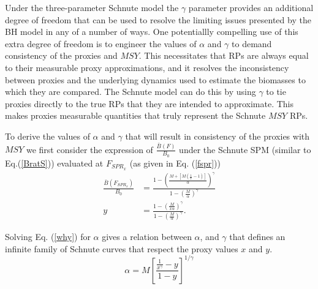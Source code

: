 %
Under the three-parameter Schnute model the $\gamma$ parameter provides an 
additional degree of freedom that can be used to resolve the limiting 
issues presented by the BH model in any of a number of ways. 
One potentiallly compelling use of this extra degree of freedom is to  
engineer the values of $\alpha$ and $\gamma$ to demand consistency of 
the proxies and $MSY$.
This necessitates that RPs are always equal to their measurable proxy approximations, 
and it resolves the inconsistency between proxies and the underlying dynamics 
used to estimate the biomasses to which they are compared. The Schnute model 
can do this by using $\gamma$ to tie proxies directly to the true RPs that 
they are intended to approximate. This makes proxies measurable quantities 
that truly represent the Schnute $MSY$ RPs. 

%
To derive the values of $\alpha$ and $\gamma$ that will result in consistency of
the proxies with $MSY$ we first consider the expression of $\frac{\bar B(F)}{B_0}$ 
under the Schnute SPM (similar to Eq.(\ref{BratS})) evaluated at $F_{SPR_x}$ (as given in Eq. (\ref{fspr})) %
%
\begin{align}
	\frac{\bar B(F_{SPR_x})}{B_0} &= \frac{1-\left(\frac{M+\left[M\left(\frac{1}{x}-1\right)\right]}{\alpha}\right)^\gamma}{ 1-\left(\frac{M}{\alpha}\right)^\gamma } \nonumber\\
	y&=\frac{1-\left(\frac{M}{x\alpha}\right)^\gamma}{ 1-\left(\frac{M}{\alpha}\right)^\gamma } \label{why}.
\end{align}

Solving Eq. (\ref{why}) for $\alpha$ gives a relation between $\alpha$, 
and $\gamma$ that defines an infinite family of Schnute curves that 
respect the proxy values $x$ and $y$.
%
\begin{equation}
\alpha = M\left[ \frac{\frac{1}{x^\gamma}-y}{1-y} \right]^{1/\gamma} \label{aProxy} %
\end{equation}

